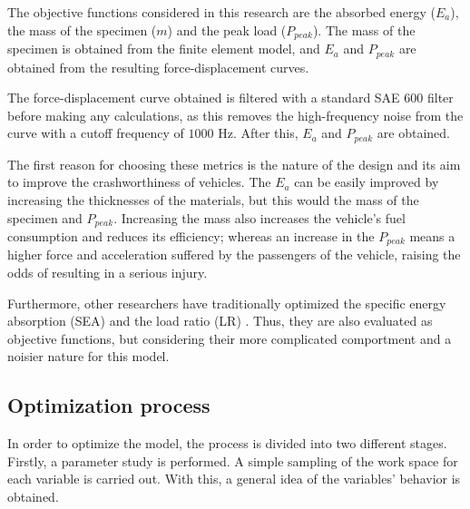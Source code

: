 \documentclass[cmfonts]{witpress}
\begin{document}
The objective functions considered in this research are the absorbed energy ($E_a$), the mass of the specimen ($m$) and the peak load ($P_{peak}$). The mass of the specimen is obtained from the finite element model, and $E_a$ and $P_{peak}$ are obtained from the resulting force-displacement curves.

The force-displacement curve obtained is filtered with a standard SAE 600 filter \cite{J211} before making any calculations, as this removes the high-frequency noise from the curve with a cutoff frequency of ${1000}$ Hz. After this, $E_a$ and $P_{peak}$ are obtained.


The first reason for choosing these metrics is the nature of the design and its aim to improve the crashworthiness of vehicles. The $E_a$ can be easily improved by increasing the thicknesses of the materials, but this would the mass of the specimen and $P_{peak}$. Increasing the mass also  increases the vehicle's fuel consumption and reduces its efficiency; whereas an increase in the $P_{peak}$ means a higher force and acceleration suffered by the passengers of the vehicle, raising the odds of resulting in a serious injury.

Furthermore, other researchers have traditionally optimized the specific energy absorption (SEA) and the load ratio (LR) \cite{Hou2007555}. Thus, they are also evaluated as objective functions, but considering their more complicated comportment and a noisier nature for this model. 

\subsection{Optimization process}

In order to optimize the model, the process is divided into two different stages. Firstly, a parameter study is performed. A simple sampling of the work space for each variable is carried out. With this, a general idea of the variables' behavior is obtained.
\end{document}
